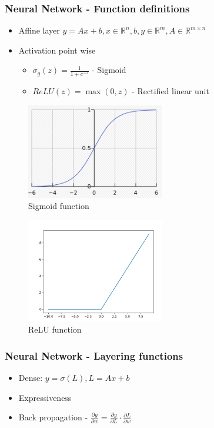 \documentclass[12pt]{report}
\begin{document}
\newpage
\subsubsection{Neural Network - Function definitions}
\begin{itemize}
	\item Affine layer $y = Ax + b , x \in \mathbb{R}^n, b, y \in \mathbb{R}^m, A \in \mathbb{R}^{m \times n}$
	\item Activation point wise
	\begin{itemize}
		\item $\sigma_g(z) = \frac{1}{1+e^{-z}}$ - Sigmoid 
		\item $ReLU(z) = \max(0, z)$  - Rectified linear unit
	\end{itemize}	
\end{itemize}

\begin{figure}[H]\centering\includegraphics[width=6cm]{sigmoid.png}\caption{Sigmoid function}\end{figure}
\begin{figure}[H]\centering\includegraphics[width=6cm]{RELU.png}\caption{ReLU function}\end{figure}

\newpage
\subsubsection{Neural Network - Layering functions}

\begin{itemize}
	\item Dense: $y = \sigma(L), L = Ax+b$
	\item Expressiveness 
	\item Back propagation - $\frac{\partial y}{ \partial w} =  \frac{\partial y}{ \partial L} \cdot \frac{\partial L}{ \partial w}$
\end{itemize}
\end{document}
